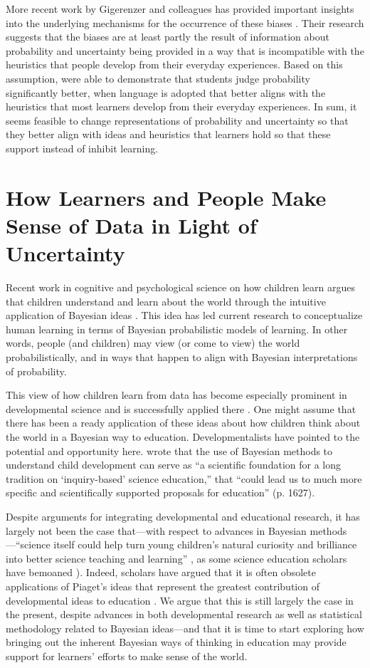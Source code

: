 \documentclass[man]{apa7}
\begin{document}
More recent work by Gigerenzer and colleagues has provided important insights into the underlying mechanisms for the occurrence of these biases \parencite{gh95, jkg18}. Their research suggests that the biases are at least partly the result of information about probability and uncertainty being provided in a way that is incompatible with the heuristics that people develop from their everyday experiences. Based on this assumption, \textcite{jkg18} were able to demonstrate that students judge probability significantly better, when language is adopted that better aligns with the heuristics that most learners develop from their everyday experiences. In sum, it seems feasible to change representations of probability and uncertainty so that they better align with ideas and heuristics that learners hold so that these support instead of inhibit learning. 

\section{How Learners and People Make Sense of Data in Light of Uncertainty}

Recent work in cognitive and psychological science on how children learn argues that children understand and learn about the world through the intuitive application of Bayesian ideas \parencite{g12, tgk06, tgk06}. This idea has led current research to conceptualize human learning in terms of Bayesian probabilistic models of learning. In other words, people (and children) may view (or come to view) the world probabilistically, and in ways that happen to align with Bayesian interpretations of probability.

This view of how children learn from data has become especially prominent in developmental science and is successfully applied there \parencite{gt07, gw12}. One might assume that there has been a ready application of these ideas about how children think about the world in a Bayesian way to education. Developmentalists have pointed to the potential and opportunity here. \textcite{g12} wrote that the use of Bayesian methods to understand child development can serve as “a scientific foundation for a long tradition on ‘inquiry-based’ science education,” that “could lead us to much more specific and scientifically supported proposals for education” (p. 1627).  

Despite arguments for integrating developmental and educational research, it has largely not been the case that—with respect to advances in Bayesian methods—“science itself could help turn young children’s natural curiosity and brilliance into better science teaching and learning” \textcite[p. 1627]{g12}, as some science education scholars have bemoaned \parencite{ls15}). Indeed, scholars have argued that it is often obsolete applications of Piaget’s ideas \textcite{pi69} that represent the greatest contribution of developmental ideas to education \textcite{ls07}. We argue that this is still largely the case in the present, despite advances in both developmental research as well as statistical methodology related to Bayesian ideas—and that it is time to start exploring how bringing out the inherent Bayesian ways of thinking in education may provide support for learners’ efforts to make sense of the world.
\end{document}
